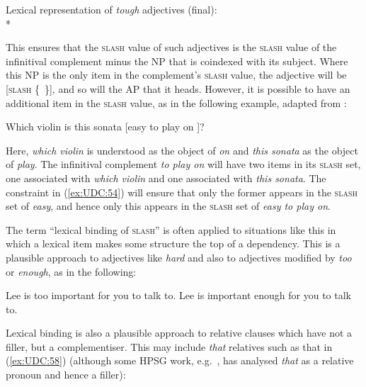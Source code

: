 \documentclass[output=paper
,notxmath 
	        ,collection
	        ,collectionchapter
 	        ,biblatex
                ,babelshorthands
                ,newtxmath
                ,draftmode
                ,colorlinks, citecolor=brown
]{langscibook}
\begin{document}
\ea
\label{ex:UDC:54}
Lexical representation of \textit{tough} adjectives (final):\\*
\z  

\noindent
This ensures that the \textsc{slash} value of such adjectives is the \textsc{slash} value of
the infinitival complement minus the NP that is coindexed with its
subject. Where this NP is the only item in the complement's \textsc{slash} value,
the adjective will be \mbox[\textsc{slash} \{~\}], and so will the AP that it
heads. However, it is possible to have an additional item in the \textsc{slash}
value, as in the following example, adapted from  \citet[169]{ps2}:

\begin{exe}
\ex \label{ex:UDC:55}
 Which violin is this sonata [easy to play \trace{} on \trace{}]?
\end{exe}

\noindent
Here, \emph{which violin} is understood as the object of \emph{on} and
\emph{this sonata} as the object of \emph{play}. The infinitival
complement \emph{to play on} will have two items in its \textsc{slash} set, one
associated with \emph{which violin} and one associated with \emph{this
sonata}. The constraint in (\ref{ex:UDC:54}) will ensure that only the former appears in the \textsc{slash} set
of \emph{easy}, and hence only this appears in the \textsc{slash} set of
\emph{easy to play on}.

The term ``lexical binding of \textsc{slash}'' is often applied to situations like
this in which a lexical item makes some structure the top of a
dependency. This is a plausible approach to adjectives like \emph{hard}
and also to adjectives modified by \emph{too} or \emph{enough}, as in the
following:

\eal
\ex \label{ex:UDC:56}
Lee is too important for you to talk to.
\ex \label{ex:UDC:57}
Lee is important enough for you to talk to.
\zl

\noindent
Lexical binding is also a plausible approach to relative clauses which
have not a filler, but a complementiser. This may include 
\emph{that} relatives such as that in (\ref{ex:UDC:58}) (although some HPSG work,
e.g.\ \citealt[Section~5.4]{Sag:97}, has analysed \emph{that} as a relative pronoun and hence
a filler):
\end{document}
